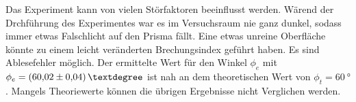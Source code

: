 Das Experiment kann von vielen Störfaktoren beeinflusst werden.
Wärend der Drchführung des Experimentes war es im Versuchsraum nie ganz dunkel, sodass immer etwas Falschlicht auf den Prisma fällt.
Eine etwas unreine Oberfläche könnte zu einem leicht veränderten Brechungsindex geführt haben.
Es sind Ablesefehler möglich.
Der ermittelte Wert für den Winkel $\phi_e$ mit $\phi_e=\SI{60,02\pm0,04}{°}$ ist nah an dem theoretischen Wert von $\phi_t=\SI{60}{°}$.
Mangels Theoriewerte können die übrigen Ergebnisse nicht Verglichen werden.
